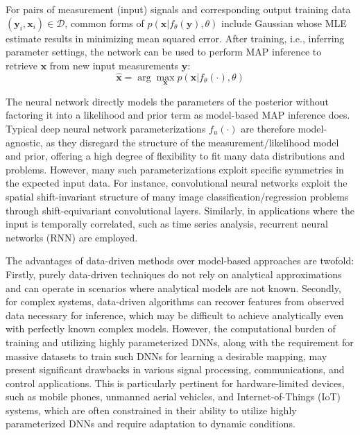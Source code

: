 For pairs of measurement (input) signals and corresponding output training data $(\mathbf{y}_i, \mathbf{x}_i) \in \mathcal{D}$, common forms of $p(\mathbf{x}|f_{\theta}(\mathbf{y}), \theta)$ include Gaussian whose MLE estimate results in minimizing mean squared error. After training, i.e., inferring parameter settings, the network can be used to perform MAP inference to retrieve $\mathbf{x}$ from new input measurements $\mathbf{y}$:
\begin{equation}
    \hat{\mathbf{x}} = \arg\max_{\mathbf{x}} p(\mathbf{x}|f_{\theta}(\cdot), \theta) 
\end{equation}

The neural network directly models the parameters of the posterior without factoring it into a likelihood and prior term as model-based MAP inference does. Typical deep neural network parameterizations $f_u(\cdot)$ are therefore model-agnostic, as they disregard the structure of the measurement/likelihood model and prior, offering a high degree of flexibility to fit many data distributions and problems. However, many such parameterizations exploit specific symmetries in the expected input data. For instance, convolutional neural networks exploit the spatial shift-invariant structure of many image classification/regression problems through shift-equivariant convolutional layers. Similarly, in applications where the input is temporally correlated, such as time series analysis, recurrent neural networks (RNN) are employed.

The advantages of data-driven methods over model-based approaches are twofold: Firstly, purely data-driven techniques do not rely on analytical approximations and can operate in scenarios where analytical models are not known. Secondly, for complex systems, data-driven algorithms can recover features from observed data necessary for inference, which may be difficult to achieve analytically even with perfectly known complex models. However, the computational burden of training and utilizing highly parameterized DNNs, along with the requirement for massive datasets to train such DNNs for learning a desirable mapping, may present significant drawbacks in various signal processing, communications, and control applications. This is particularly pertinent for hardware-limited devices, such as mobile phones, unmanned aerial vehicles, and Internet-of-Things (IoT) systems, which are often constrained in their ability to utilize highly parameterized DNNs and require adaptation to dynamic conditions.

